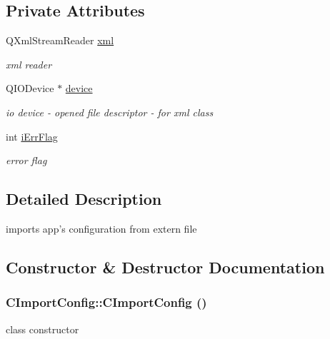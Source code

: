 \subsection*{Private Attributes}
\begin{DoxyCompactItemize}
\item 
\hypertarget{classCImportConfig_ac2d7d78339efb455940399cbe19cef5f}{
QXmlStreamReader \hyperlink{classCImportConfig_ac2d7d78339efb455940399cbe19cef5f}{xml}}
\label{classCImportConfig_ac2d7d78339efb455940399cbe19cef5f}

\begin{DoxyCompactList}\small\item\em xml reader \item\end{DoxyCompactList}\item 
\hypertarget{classCImportConfig_ae3c7a8257039bee979ad0380a25986e4}{
QIODevice $\ast$ \hyperlink{classCImportConfig_ae3c7a8257039bee979ad0380a25986e4}{device}}
\label{classCImportConfig_ae3c7a8257039bee979ad0380a25986e4}

\begin{DoxyCompactList}\small\item\em io device -\/ opened file descriptor -\/ for xml class \item\end{DoxyCompactList}\item 
\hypertarget{classCImportConfig_aac8875dde79755767f78c55753c91e38}{
int \hyperlink{classCImportConfig_aac8875dde79755767f78c55753c91e38}{iErrFlag}}
\label{classCImportConfig_aac8875dde79755767f78c55753c91e38}

\begin{DoxyCompactList}\small\item\em error flag \item\end{DoxyCompactList}\end{DoxyCompactItemize}


\subsection{Detailed Description}
imports app's configuration from extern file 

\subsection{Constructor \& Destructor Documentation}
\hypertarget{classCImportConfig_a97be714a5a5005731dc6938243c26796}{
\subsubsection[{CImportConfig}]{\setlength{\rightskip}{0pt plus 5cm}CImportConfig::CImportConfig ()}}
\label{classCImportConfig_a97be714a5a5005731dc6938243c26796}
class constructor 

